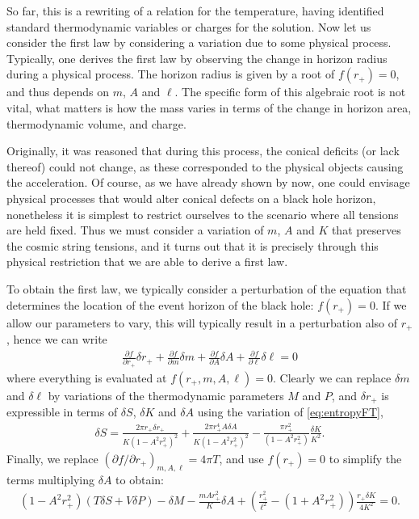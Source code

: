 \documentclass[
twoside,
openright,
frontopenright,
]{dmathesis}
\begin{document}
So far, this is a rewriting of a relation for the temperature, having identified
standard thermodynamic variables or charges for the solution. Now let us
consider the first law by considering a variation due to some physical process.
Typically, one derives the first law by observing the change in horizon radius
during a physical process. The horizon radius is given by a root of $f(r_+)=0$,
and thus depends on $m$, $A$ and $\ell$. The specific form of this
algebraic root is not vital, what matters is how the mass varies in terms of the
change in horizon area, thermodynamic volume, and charge.

Originally, it was reasoned that during this process, the conical deficits (or
lack thereof) could not change, as these corresponded to the physical objects
causing the acceleration. Of course, as we have already shown by now, one could
envisage physical processes that would alter conical defects on a black hole
horizon, nonetheless it is simplest to restrict ourselves to the scenario where
all tensions are held fixed. Thus we must consider a variation of $m$, $A$ and
$K$ that preserves the cosmic string tensions, and it turns out that it is
precisely through this physical restriction that we are able to derive a first
law.

To obtain the first law, we typically consider a perturbation of the equation
that determines the location of the event horizon of the black hole:
$f(r_+)=0$. If we allow our parameters to vary, this will typically result in a
perturbation also of $r_+$, hence we can write
\begin{align}
\frac{\partial f}{\partial r_+} \delta r_+ +
\frac{\partial f}{\partial m} \delta m +
\frac{\partial f}{\partial A} \delta A +
\frac{\partial f}{\partial \ell} \delta \ell =0
\end{align}
where everything is evaluated at $f(r_+, m,A, \ell)=0$.  Clearly we can replace
$\delta m$ and $\delta \ell$ by variations of the thermodynamic parameters $M$
and $P$, and $\delta r_+$ is expressible in terms of $\delta S$, $\delta K$ and
$\delta A$ using the variation of \cref{eq:entropyFT},
\begin{align}
  \label{eq:varentropy}
\delta S = \frac{2\pi r_+ \delta r_+}{K(1-A^2 r_+^2)^2} + 
\frac{2 \pi r_+^4 A\delta A}{K (1-A^2 r_+^2)^2} - 
\frac{\pi r_+^2}{(1-A^2 r_+^2)} \frac{\delta K}{K^2}.
\end{align}
Finally, we replace $(\partial f /\partial r_+)_{m, A, \ell} = 4 \pi T$, and use
$f(r_+)=0$ to simplify the terms multiplying $\delta A$ to obtain:
\begin{align}
(1-A^2 r_+^2) (T \delta S + V \delta P) - \delta M - \frac{m A r_+^2}{K} \delta
  A + \left(\frac{r_+^2}{\ell^2}-(1+A^2r_+^2)\right)\frac{r_+\delta K}{4K^2}  =0.
\label{eq:firstint}
\end{align}
\end{document}
